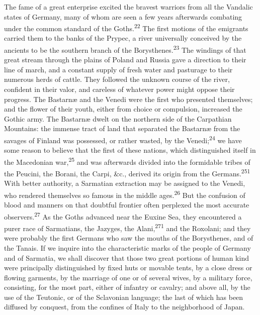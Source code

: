The fame of a great enterprise excited the bravest warriors from
all the Vandalic states of Germany, many of whom are seen a few
years afterwards combating under the common standard of the
Goths.\textsuperscript{22} The first motions of the emigrants carried them to the
banks of the Prypec, a river universally conceived by the
ancients to be the southern branch of the Borysthenes.\textsuperscript{23} The
windings of that great stream through the plains of Poland and
Russia gave a direction to their line of march, and a constant
supply of fresh water and pasturage to their numerous herds of
cattle. They followed the unknown course of the river, confident
in their valor, and careless of whatever power might oppose their
progress. The Bastarnæ and the Venedi were the first who
presented themselves; and the flower of their youth, either from
choice or compulsion, increased the Gothic army. The Bastarnæ
dwelt on the northern side of the Carpathian Mountains: the
immense tract of land that separated the Bastarnæ from the
savages of Finland was possessed, or rather wasted, by the
Venedi;\textsuperscript{24} we have some reason to believe that the first of these
nations, which distinguished itself in the Macedonian war,\textsuperscript{25} and
was afterwards divided into the formidable tribes of the Peucini,
the Borani, the Carpi, \&c., derived its origin from the Germans.\textsuperscript{251}
With better authority, a Sarmatian extraction may be assigned
to the Venedi, who rendered themselves so famous in the middle
ages.\textsuperscript{26} But the confusion of blood and manners on that doubtful
frontier often perplexed the most accurate observers.\textsuperscript{27} As the
Goths advanced near the Euxine Sea, they encountered a purer race
of Sarmatians, the Jazyges, the Alani,\textsuperscript{271} and the Roxolani; and
they were probably the first Germans who saw the mouths of the
Borysthenes, and of the Tanais. If we inquire into the
characteristic marks of the people of Germany and of Sarmatia, we
shall discover that those two great portions of human kind were
principally distinguished by fixed huts or movable tents, by a
close dress or flowing garments, by the marriage of one or of
several wives, by a military force, consisting, for the most
part, either of infantry or cavalry; and above all, by the use of
the Teutonic, or of the Sclavonian language; the last of which
has been diffused by conquest, from the confines of Italy to the
neighborhood of Japan.


